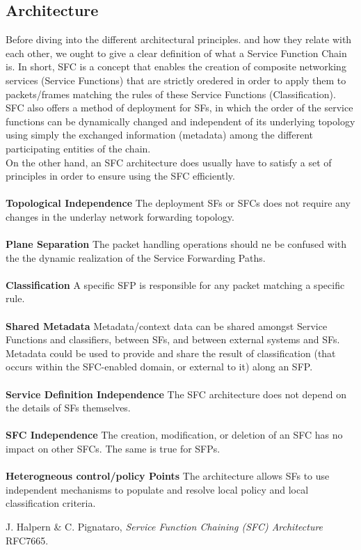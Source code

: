 \documentclass[a4paper]{article}
\begin{document}
\subsection{Architecture}
Before diving into the different architectural principles. and how they relate with each other, we ought to give a clear definition of what a Service Function Chain is. In short, SFC is a concept that enables the creation of composite networking services (Service Functions) that are strictly oredered in order to apply them to packets/frames matching the rules of these Service Functions (Classification). SFC also offers a method of deployment for SFs, in which the order of the service functions can be dynamically changed and independent of its underlying topology using simply the exchanged information (metadata) among the different participating entities of the chain.\\
On the other hand, an SFC architecture does usually have to satisfy a set of principles in order to ensure using the SFC efficiently.\\
\\
\textbf{Topological Independence} 
The deployment SFs or SFCs does not require any changes in the underlay network forwarding topology.\\
\\
\textbf{Plane Separation} The packet handling operations should ne be confused with the the dynamic realization of the Service Forwarding Paths.\\
\\
\textbf{Classification} A specific SFP is responsible for any packet matching a specific rule.\\
\\
\textbf{Shared Metadata} Metadata/context data can be shared amongst Service Functions and classifiers, between SFs, and between external systems and SFs. Metadata could be used to provide and share the result of classification (that occurs within the SFC-enabled domain, or external to it) along an SFP.\\
\\ 
\textbf{Service Definition Independence} The SFC architecture does not depend on the details of SFs themselves.\\
\\
\textbf{SFC Independence} The creation, modification, or deletion of an SFC has no impact on other SFCs. The same is true for SFPs.\\
\\
\textbf{Heterogneous control/policy Points} The architecture allows SFs
to use independent mechanisms to
populate and resolve local policy and  local classification criteria.

\begin{thebibliography}{9}
  J. Halpern \& C. Pignataro,
  \emph{Service Function Chaining (SFC) Architecture} RFC7665.
  

\end{thebibliography}
\end{document}
